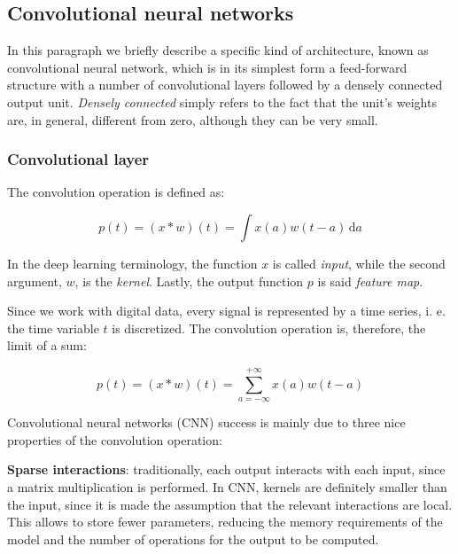 \documentclass[a4paper, twoside]{article}
\begin{document}
    \subsection{Convolutional neural networks}
        In this paragraph we briefly describe a specific kind of architecture, known as convolutional neural network, which is in its simplest form a feed-forward structure with a number of convolutional layers followed by a densely connected output unit. \textit{Densely connected} simply refers to the fact that the unit's weights are, in general, different from zero, although they can be very small.

        \subsubsection{Convolutional layer}

        The convolution operation is defined as:

        $$ p(t) = (x \ast w)(t) = \int \! x(a)w(t-a) \, \mathrm{d}a $$

        In the deep learning terminology, the function $x$ is called \textit{input}, while the second argument, $w$, is the \textit{kernel}. Lastly, the output function $p$ is said \textit{feature map}.

        Since we work with digital data, every signal is represented by a time series, i. e. the time variable $t$ is discretized. The convolution operation is, therefore, the limit of a sum:

        $$p(t) = (x \ast w)(t) = \sum_{a = -\infty}^{+\infty} x(a) w(t-a) $$

        Convolutional neural networks (CNN) success is mainly due to three nice properties of the convolution operation:

        \textbf{Sparse interactions}: traditionally, each output interacts with each input, since a matrix multiplication is performed. In CNN, kernels are definitely smaller than the input, since it is made the assumption that the relevant interactions are local. This allows to store fewer parameters, reducing the memory requirements of the model and the number of operations for the output to be computed.
\end{document}
